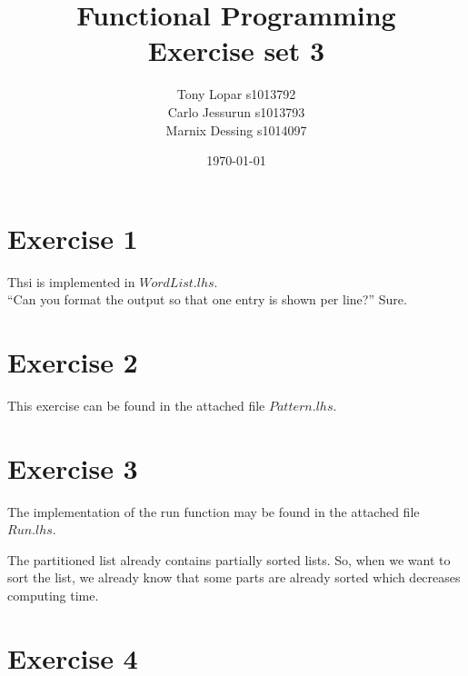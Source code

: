 \documentclass{article}
\begin{document}
\title{Functional Programming \\ Exercise set 3}
\date{\today}
\author{Tony Lopar s1013792 \\ Carlo Jessurun s1013793 \\ Marnix Dessing s1014097}
\maketitle

\section*{Exercise 1}
Thsi is implemented in $WordList.lhs$.\\
``Can you format the output so that one entry is shown per line?'' Sure.

\section*{Exercise 2}
This exercise can be found in the attached file $Pattern.lhs$.

\section*{Exercise 3}
The implementation of the run function may be found in the attached file $Run.lhs$.

The partitioned list already contains partially sorted lists. So, when we want to sort the list, we already know that some parts are already sorted which decreases computing time.

\section*{Exercise 4}
\end{document}
